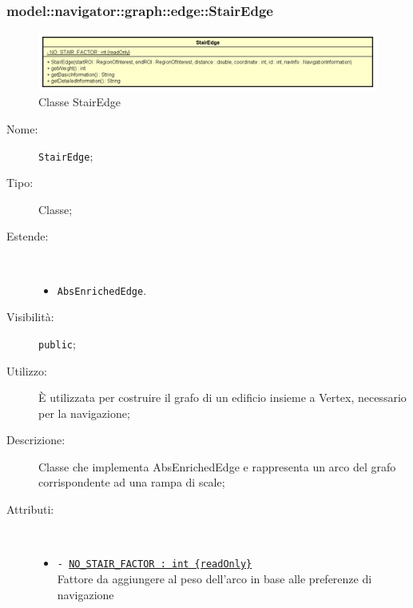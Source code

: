 \documentclass[../DefinizioneDiProdotto.tex]{subfiles}
\begin{document}
\subsubsection{model::navigator::graph::edge::StairEdge}

    \begin{figure}[H]
        \centering
        \includegraphics{img/StairEdge.png}
        \caption{Classe StairEdge}\label{fig:model::navigator::graph::edge::StairEdge} 
    \end{figure}
    \begin{description}
\item[Nome:] \texttt{StairEdge};
\item[Tipo:] Classe;
\item[Estende:] \
\begin{itemize}
\item \texttt{AbsEnrichedEdge}.
\end{itemize}
\item[Visibilità:] \texttt{public};
\item[Utilizzo:] È utilizzata per costruire il grafo di un edificio insieme a Vertex, necessario per la navigazione;
\item[Descrizione:] Classe che implementa AbsEnrichedEdge e rappresenta un arco del grafo corrispondente ad una rampa di scale;
\item[Attributi:] \
\begin{itemize}
\item \texttt{- \underline{NO\_STAIR\_FACTOR : int \{readOnly\}}}\\
Fattore da aggiungere al peso dell'arco in base alle preferenze di navigazione


\end{itemize}
\end{description}
\end{document}
